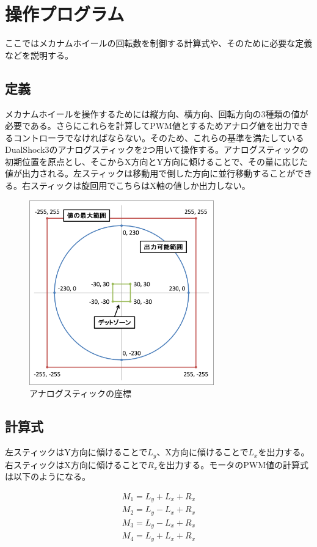 \documentclass[12pt,oneside]{sotsuken_paper}
\begin{document}
	\section{操作プログラム}
	ここではメカナムホイールの回転数を制御する計算式や、そのために必要な定義などを説明する。

		\subsection{定義}
		メカナムホイールを操作するためには縦方向、横方向、回転方向の3種類の値が必要である。さらにこれらを計算してPWM値とするためアナログ値を出力できるコントローラでなければならない。そのため、これらの基準を満たしているDualShock3のアナログスティックを2つ用いて操作する。アナログスティックの初期位置を原点とし、そこからX方向とY方向に傾けることで、その量に応じた値が出力される。左スティックは移動用で倒した方向に並行移動することができる。右スティックは旋回用でこちらはX軸の値しか出力しない。

		\begin{figure}[htp]
			\begin{center}
				\includegraphics[width=80mm]{Image/座標.png}
				\caption{アナログスティックの座標}
				\label{座標}
			\end{center}
		\end{figure}

		\subsection{計算式}
		左スティックはY方向に傾けることで$L_y$、X方向に傾けることで$L_x$を出力する。右スティックはX方向に傾けることで$R_x$を出力する。モータのPWM値の計算式は以下のようになる。

		\begin{eqnarray}
		M_1 = L_y + L_x + R_x
		\label{式1}
		\\
		M_2 = L_y - L_x + R_x
		\label{式2}
		\\
		M_3 = L_y - L_x + R_x
		\label{式3}
		\\
		M_4 = L_y + L_x + R_x
		\label{式4}
		\end{eqnarray}
\end{document}
